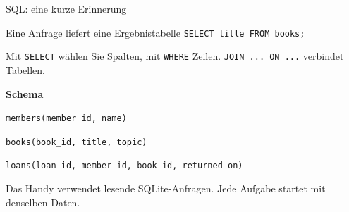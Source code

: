 \begin{frame}[t]{SQL: eine kurze Erinnerung}

\begin{block}{Eine Anfrage liefert eine Ergebnistabelle}
\texttt{SELECT title FROM books;}\par\smallskip
Mit \texttt{SELECT} wählen Sie Spalten, mit \texttt{WHERE} Zeilen.
\texttt{JOIN ... ON ...} verbindet Tabellen.
\end{block}\small
\textbf{Schema}\par
\texttt{members(member\_id, name)}\par
\texttt{books(book\_id, title, topic)}\par
\texttt{loans(loan\_id, member\_id, book\_id, returned\_on)}
\vspace{3mm}\par Das Handy verwendet lesende SQLite-Anfragen. Jede Aufgabe startet mit denselben Daten.

\end{frame}
